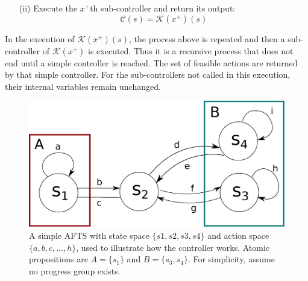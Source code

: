 \begin{definition}
\begin{itemize}
		\item[(ii)] Execute the $ x^+ $th sub-controller and return its output: %
		\begin{displaymath}
		\mathcal{C}(s) = \mathcal{K}(x^+)(s)
		\end{displaymath}
	\end{itemize}
	
	In the execution of $ \mathcal{K}(x^+)(s) $, the process above is repeated and then a sub-controller of $ \mathcal{K}(x^+) $ is executed. Thus it is a recursive process that does not end until a simple controller is reached.
	The set of feasible actions are returned by that simple controller. For the sub-controllers not called in this execution, their internal variables remain unchanged.
	
	
	\label{def:exec}
\end{definition}


\begin{figure}
	\centering
	\includegraphics[width=0.4\linewidth]{pic/eg1}
	\caption{A simple AFTS with state space $\{s1,s2,s3,s4\}$ and action space $\{a,b,c, ...,h\}$, used to illustrate how the controller works. Atomic propositions are $ A =\{s_1\} $ and $ B=\{s_3, s_4\} $. For simplicity, assume no progress group exists.}  
	\label{fig:eg1}
\end{figure}

